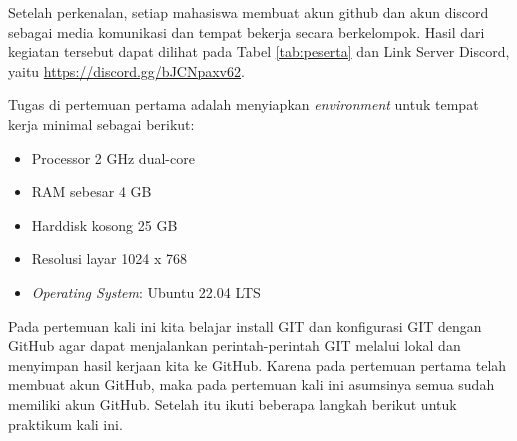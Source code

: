 \documentclass[a4paper]{tufte-handout}
\begin{document}
\vspace*{.5cm}
Setelah perkenalan, setiap mahasiswa membuat akun github dan akun discord sebagai media komunikasi dan tempat bekerja secara berkelompok. Hasil dari kegiatan tersebut dapat dilihat pada Tabel \ref{tab:peserta} dan Link Server Discord, yaitu \url{https://discord.gg/bJCNpaxv62}.

Tugas di pertemuan pertama adalah menyiapkan \textit{environment} untuk tempat kerja minimal sebagai berikut:
\begin{multicols}{2}
\begin{itemize}
\setlength\itemsep{0em}
\item Processor 2 GHz dual-core
\item RAM sebesar 4 GB
\item Harddisk kosong 25 GB
\item Resolusi layar 1024 x 768
\item \textit{Operating System}: Ubuntu 22.04 LTS
\end{itemize}
\end{multicols}
\hrulefill

\clearpage
{}


Pada pertemuan kali ini kita belajar install GIT dan konfigurasi GIT dengan GitHub agar dapat menjalankan perintah-perintah GIT melalui lokal dan menyimpan hasil kerjaan kita ke GitHub. Karena pada pertemuan pertama telah membuat akun GitHub, maka pada pertemuan kali ini asumsinya semua sudah memiliki akun GitHub. Setelah itu ikuti beberapa langkah berikut untuk praktikum kali ini.
\end{document}
